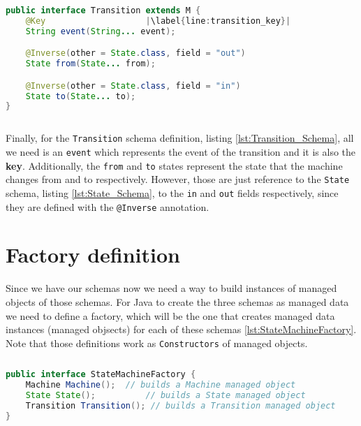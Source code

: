 \begin{sourcecode}[H]
	\begin{lstlisting}[language=Java,escapechar=|]
public interface Transition extends M {
	@Key 					|\label{line:transition_key}| 
	String event(String... event);

	@Inverse(other = State.class, field = "out")
	State from(State... from);

	@Inverse(other = State.class, field = "in")
	State to(State... to);
}
	\end{lstlisting}
	\caption{The Transition Schema}
	\label{lst:Transition_Schema}
\end{sourcecode}

Finally, for the \texttt{Transition} schema definition, listing \ref{lst:Transition_Schema}, all we need is an \texttt{event} which represents the event of the transition and it is also the \textbf{key}.
Additionally, the \texttt{from} and \texttt{to} states represent the state that the machine changes from and to respectively.
However, those are just reference to the \texttt{State} schema, listing \ref{lst:State_Schema}, to the \texttt{in} and \texttt{out} fields respectively, since they are defined with the \texttt{@Inverse} annotation.

\section{Factory definition}
Since we have our schemas now we need a way to build instances of managed objects of those schemas. 
For Java to create the three schemas as managed data we need to define a factory, which will be the one that creates managed data instances (managed objsects) for each of these schemas \ref{lst:StateMachineFactory}.
Note that those definitions work as \texttt{Constructors} of managed objects.

\begin{sourcecode}[H]
	\begin{lstlisting}[language=Java,escapechar=|]
public interface StateMachineFactory {
	Machine Machine();  // builds a Machine managed object
	State State(); 			// builds a State managed object
	Transition Transition(); // builds a Transition managed object
}
	\end{lstlisting}
	\caption{The StateMachine Factory}
	\label{lst:StateMachineFactory}
\end{sourcecode}

